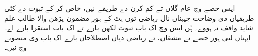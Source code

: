 \documentclass[../../include/open-logic-part]{subfiles}
\begin{document}

\begin{editorial}
  ایس حصے وچ عام گلاں تے کم کرن دے طریقے نیں، خاص کر کے ثبوت دے کئی طریقیاں دی وضاحت جیہناں نال ریاضی توں ہٹ کے ہور مضمون پڑھن والا طالب علم شاید واقف نہ ہووے۔ ہُن ایس وچ اک باب ثبوت لکھن بارے تے اک باب استقرا بارے اے۔ ایہناں لئی ہور حصے تے مشقاں، تے ریاضی دیاں اصطلاحاں بارے اک باب وی منصوبے وچ نیں۔
\end{editorial}



\OLEndPartHook
\end{document}
